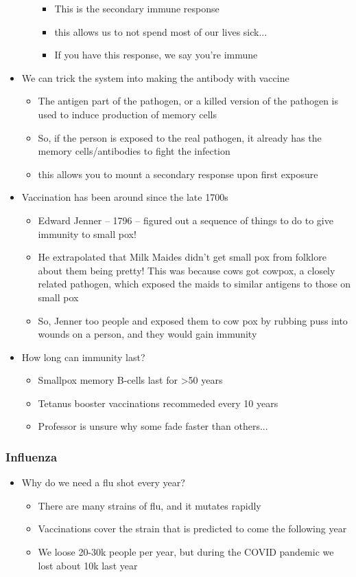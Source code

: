 \documentclass{article}
\theoremstyle{definition}
\begin{document}
\begin{itemize}
\begin{itemize}
\begin{itemize}
					\item This is the secondary immune response
					\item this allows us to not spend most of our lives sick...
					\item If you have this response, we say you're immune
				\end{itemize}
		\end{itemize}
	\item We can trick the system into making the antibody with vaccine
		\begin{itemize}
			\item The antigen part of the pathogen, or a killed version of the pathogen is used to induce production of memory cells
			\item So, if the person is exposed to the real pathogen, it already has the memory cells/antibodies to fight the infection
			\item this allows you to mount a secondary response upon first exposure
		\end{itemize}
	\item Vaccination has been around since the late 1700s
		\begin{itemize}
			\item Edward Jenner -- 1796 -- figured out a sequence of things to do to give immunity to small pox!
			\item He extrapolated that Milk Maides didn't get small pox from folklore about them being pretty! This was because cows got cowpox, a closely related pathogen, which exposed the maids to similar antigens to those on small pox
			\item So, Jenner too people and exposed them to cow pox by rubbing puss into wounds on a person, and they would gain immunity
		\end{itemize}
	\item How long can immunity last?
		\begin{itemize}
			\item Smallpox memory B-cells last for  >50 years
			\item Tetanus booster vaccinations recommeded every 10 years
			\item Professor is unsure why some fade faster than others...
		\end{itemize}
\end{itemize}
\subsubsection{Influenza}
\begin{itemize}
	\item Why do we need a flu shot every year?
		\begin{itemize}
			\item There are many strains of flu, and it mutates rapidly
			\item Vaccinations cover the strain that is predicted to come the following year
			\item We loose 20-30k people per year, but during the COVID pandemic we lost about 10k last year
		\end{itemize}
\end{itemize}
\end{document}
